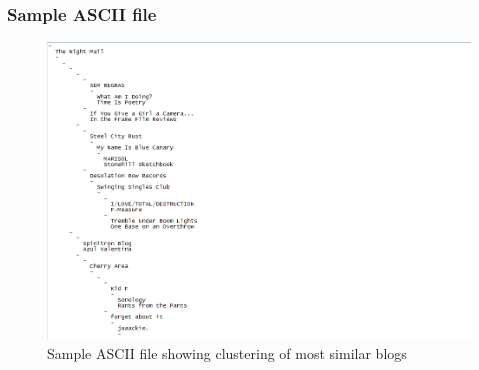\subsubsection{Sample ASCII file}
\begin{figure}[ht]    
    \begin{center}
        \includegraphics[scale=0.8]{sample_ascii5_2.png}
        \caption{Sample ASCII file showing clustering of most similar blogs }
        \label{Sample5_t2}
    \end{center}
\end{figure}
\newpage
